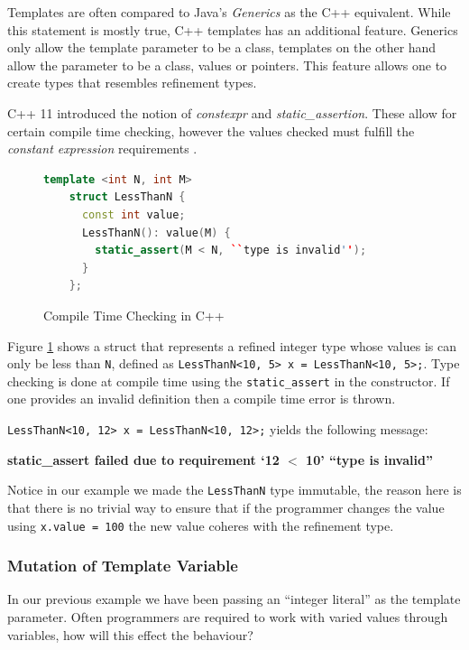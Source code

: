 \documentclass[a4paper,12pt]{report}
\begin{document}
\par
Templates are often compared to Java's \textit{Generics} \cite{javaGenerics} 
as the C++ equivalent. While this statement is mostly true, C++ templates 
has an additional feature. Generics only allow the template parameter to be a 
class, templates on the other hand allow the parameter to be a class, values 
or pointers. This feature allows one to create types that resembles refinement types. 

\par
C++ 11 introduced the notion of 
\textit{constexpr} and \textit{static\_assertion}. These allow for certain 
compile time checking, however the values checked must fulfill 
the \textit{constant expression} requirements \cite{cppConstExpr}. 

\begin{figure}[H]
  \begin{lstlisting}[language=c++]     
    template <int N, int M>
    struct LessThanN {
      const int value;
      LessThanN(): value(M) {
        static_assert(M < N, ``type is invalid'');
      }
    };
  \end{lstlisting}
  \caption{Compile Time Checking in C++}
  \label{code:compileLTN}
\end{figure}

\par
Figure \ref{code:compileLTN} shows a struct that represents a refined integer 
type whose values is can only be less than \verb|N|, defined as 
\verb|LessThanN<10, 5> x = LessThanN<10, 5>;|. Type checking is done at compile 
time using the \verb|static_assert| in the constructor. If one provides an 
invalid definition then a compile time error is thrown. 

\par
\verb|LessThanN<10, 12> x = LessThanN<10, 12>;| yields the following message: 
\par
\textbf{static\_assert failed due to requirement `12 $<$ 10' ``type is invalid''}

\par
Notice in our example we made the \verb|LessThanN| type immutable, the reason 
here is that there is no trivial way to ensure that if the programmer changes the 
value using \verb|x.value = 100| the new value coheres with the refinement 
type.

\subsubsection{Mutation of Template Variable}
In our previous example we have been passing an ``integer literal'' as the template 
parameter. Often programmers are required to 
work with varied values through variables, how will this effect the behaviour? 
\end{document}
